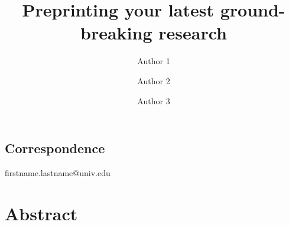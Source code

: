\documentclass[onecolumn, 11pt,openany]{memoir}
\begin{document}
\thispagestyle{empty}                   
\frontmatter

\title{Preprinting your latest ground-breaking research}
\author[1,2]{Author 1}
\author[1]{Author 2}
\author[3]{Author 3}
\begin{scriptsize}
\end{scriptsize}
\date{\vspace{-5ex}} %
\maketitle

\subsection{Correspondence}
firstname.lastname@univ.edu

\pagestyle{plain}

\section{Abstract}
\lipsum[1-1]
\end{document}
